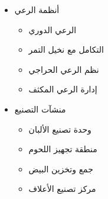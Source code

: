 \begin{itemize}
\begin{itemize}
        \item أنظمة الرعي
        \begin{itemize}
            \item الرعي الدوري
            \item التكامل مع نخيل التمر
            \item نظم الرعي الحراجي
            \item إدارة الرعي المكثف
        \end{itemize}
        
        \item منشآت التصنيع
        \begin{itemize}
            \item وحدة تصنيع الألبان
            \item منطقة تجهيز اللحوم
            \item جمع وتخزين البيض
            \item مركز تصنيع الأعلاف
        \end{itemize}
    \end{itemize}
\end{itemize}


